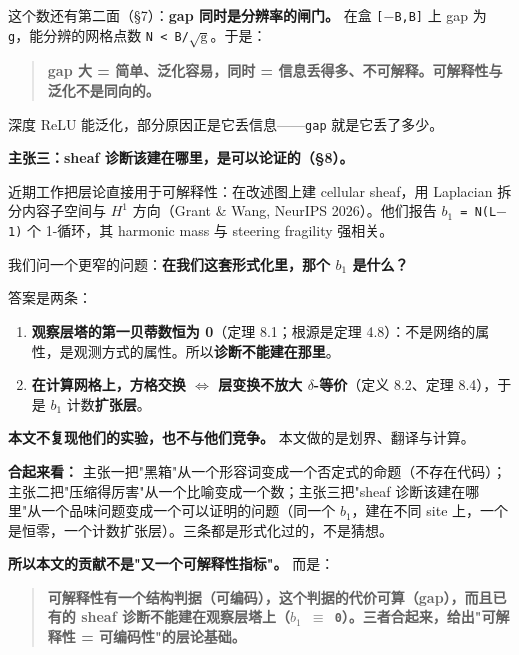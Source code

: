 \documentclass[11pt,a4paper]{ctexart}
\begin{document}
这个数还有第二面（§7）：\textbf{gap 同时是分辨率的闸门。} 在盒 \texttt{[\ensuremath{-}B,B]} 上 gap 为 \texttt{g}，能分辨的网格点数 \texttt{N < B/\ensuremath{\sqrt{\mathrm{g}}}}。于是：

\begin{quote}
\textbf{gap 大 = 简单、泛化容易，同时 = 信息丢得多、不可解释。可解释性与泛化不是同向的。}
\end{quote}

深度 ReLU 能泛化，部分原因正是它丢信息——\texttt{gap} 就是它丢了多少。

\textbf{主张三：sheaf 诊断该建在哪里，是可以论证的（§8）。}

近期工作把层论直接用于可解释性：在改述图上建 cellular sheaf，用 Laplacian 拆分内容子空间与 \texttt{\ensuremath{H^{1}}} 方向（Grant \& Wang, NeurIPS 2026）。他们报告 \texttt{\ensuremath{b_{1}} = N(L\ensuremath{-}1)} 个 1-循环，其 harmonic mass 与 steering fragility 强相关。

我们问一个更窄的问题：\textbf{在我们这套形式化里，那个 \texttt{\ensuremath{b_{1}}} 是什么？}

答案是两条：

\begin{enumerate}
\item \textbf{观察层塔的第一贝蒂数恒为 0}（定理 8.1；根源是定理 4.8）：不是网络的属性，是观测方式的属性。所以\textbf{诊断不能建在那里}。
\item \textbf{在计算网格上，方格交换 \ensuremath{\Longleftrightarrow} 层变换不放大 \ensuremath{\delta}-等价}（定义 8.2、定理 8.4），于是 \texttt{\ensuremath{b_{1}}} 计数\textbf{扩张层}。
\end{enumerate}

\textbf{本文不复现他们的实验，也不与他们竞争。} 本文做的是划界、翻译与计算。

\textbf{合起来看：} 主张一把"黑箱"从一个形容词变成一个否定式的命题（不存在代码）；主张二把"压缩得厉害"从一个比喻变成一个数；主张三把"sheaf 诊断该建在哪里"从一个品味问题变成一个可以证明的问题（同一个 \texttt{\ensuremath{b_{1}}}，建在不同 site 上，一个是恒零，一个计数扩张层）。三条都是形式化过的，不是猜想。

\textbf{所以本文的贡献不是"又一个可解释性指标"。} 而是：

\begin{quote}
\textbf{可解释性有一个结构判据（可编码），这个判据的代价可算（gap），而且已有的 sheaf 诊断不能建在观察层塔上（\texttt{\ensuremath{b_{1}} \ensuremath{\equiv} 0}）。三者合起来，给出"可解释性 = 可编码性"的层论基础。}
\end{quote}
\end{document}

